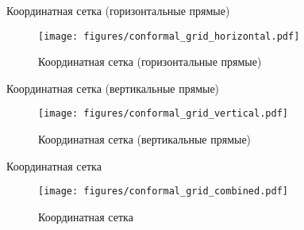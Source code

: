 \begin{frame}{Координатная сетка (горизонтальные прямые)}
	\begin{figure}
		\centering
		\texttt{[image: figures/conformal\_grid\_horizontal.pdf]}
		\caption{Координатная сетка (горизонтальные прямые)}\label{fig:conformal_grid_horizontal}
	\end{figure}
\end{frame}

\begin{frame}{Координатная сетка (вертикальные прямые)}
	\begin{figure}
		\centering
		\texttt{[image: figures/conformal\_grid\_vertical.pdf]}
		\caption{Координатная сетка (вертикальные прямые)}\label{fig:conformal_grid_vertical}
	\end{figure}
\end{frame}


\begin{frame}{Координатная сетка}
	\begin{figure}
		\centering
		\texttt{[image: figures/conformal\_grid\_combined.pdf]}
		\caption{Координатная сетка}\label{fig:conformal_grid}
	\end{figure}
\end{frame}
